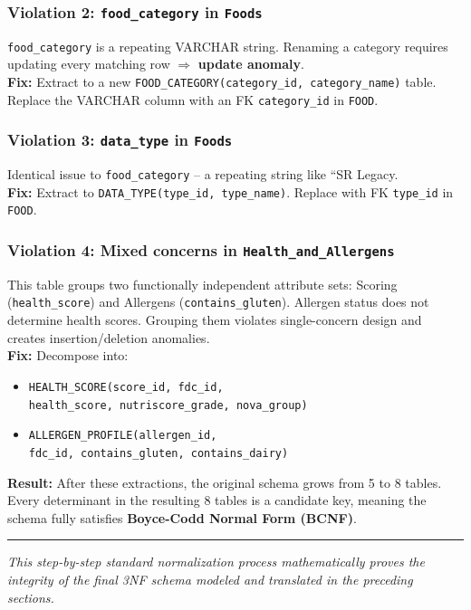 \documentclass[12pt,a4paper]{article}
\begin{document}
\subsubsection*{Violation 2: \texttt{food\_category} in \texttt{Foods}}
\texttt{food\_category} is a repeating VARCHAR string. Renaming a category requires updating every matching row $\Rightarrow$ \textbf{update anomaly}. \\
\textbf{Fix:} Extract to a new \texttt{FOOD\_CATEGORY(category\_id, category\_name)} table. Replace the VARCHAR column with an FK \texttt{category\_id} in \texttt{FOOD}.

\subsubsection*{Violation 3: \texttt{data\_type} in \texttt{Foods}}
Identical issue to \texttt{food\_category} -- a repeating string like ``SR Legacy. \\
\textbf{Fix:} Extract to \texttt{DATA\_TYPE(type\_id, type\_name)}. Replace with FK \texttt{type\_id} in \texttt{FOOD}.

\subsubsection*{Violation 4: Mixed concerns in \texttt{Health\_and\_Allergens}}
This table groups two functionally independent attribute sets: Scoring (\texttt{health\_score}) and Allergens (\texttt{contains\_gluten}). Allergen status does not determine health scores. Grouping them violates single-concern design and creates insertion/deletion anomalies. \\
\textbf{Fix:} Decompose into:
\begin{itemize}
  \item \texttt{HEALTH\_SCORE(score\_id, fdc\_id,} \\ \texttt{health\_score, nutriscore\_grade, nova\_group)}
  \item \texttt{ALLERGEN\_PROFILE(allergen\_id,} \\ \texttt{fdc\_id, contains\_gluten, contains\_dairy)}
\end{itemize}

\textbf{Result:} After these extractions, the original schema grows from 5 to 8 tables. Every determinant in the resulting 8 tables is a candidate key, meaning the schema fully satisfies \textbf{Boyce-Codd Normal Form (BCNF)}.

\vspace{1em}
\hrule
\vspace{1em}
{\sloppy \textit{This step-by-step standard normalization process mathematically proves the integrity of the final 3NF schema modeled and translated in the preceding sections.} \par}
\end{document}
